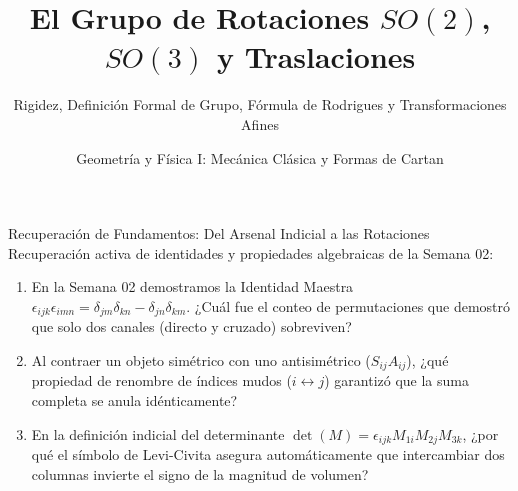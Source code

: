 \documentclass[10pt,aspectratio=169]{beamer}
\title[Semana 3: Rotaciones y Traslaciones]{El Grupo de Rotaciones $SO(2)$, $SO(3)$ y Traslaciones}
\subtitle{Rigidez, Definición Formal de Grupo, Fórmula de Rodrigues y Transformaciones Afines}
\author{Geometría y Física I: Mecánica Clásica y Formas de Cartan}
\institute{}
\date{}
\begin{document}
\setlength{\abovedisplayskip}{3pt}
\setlength{\belowdisplayskip}{3pt}

\begin{frame}
  \titlepage
\end{frame}

\begin{frame}{Recuperación de Fundamentos: Del Arsenal Indicial a las Rotaciones}
  \vspace{0.1cm}
  Recuperación activa de identidades y propiedades algebraicas de la Semana 02:
  \vspace{0.3cm}
  \begin{enumerate}\itemsep14pt
    \item En la Semana 02 demostramos la Identidad Maestra $\epsilon_{ijk}\epsilon_{imn} = \delta_{jm}\delta_{kn} - \delta_{jn}\delta_{km}$. ¿Cuál fue el conteo de permutaciones que demostró que solo dos canales (directo y cruzado) sobreviven?
    \item Al contraer un objeto simétrico con uno antisimétrico ($S_{ij}A_{ij}$), ¿qué propiedad de renombre de índices mudos ($i \leftrightarrow j$) garantizó que la suma completa se anula idénticamente?
    \item En la definición indicial del determinante $\det(M) = \epsilon_{ijk} M_{1i} M_{2j} M_{3k}$, ¿por qué el símbolo de Levi-Civita asegura automáticamente que intercambiar dos columnas invierte el signo de la magnitud de volumen?
  \end{enumerate}
\end{frame}
\end{document}
